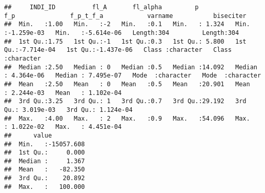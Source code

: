 \documentclass[
]{book}
\newenvironment{Shaded}{\begin{snugshade}}{\end{snugshade}}
\newcommand{\CommentTok}[1]{\textcolor[rgb]{0.56,0.35,0.01}{\textit{#1}}}
\newcommand{\DataTypeTok}[1]{\textcolor[rgb]{0.13,0.29,0.53}{#1}}
\newcommand{\KeywordTok}[1]{\textcolor[rgb]{0.13,0.29,0.53}{\textbf{#1}}}
\newcommand{\NormalTok}[1]{#1}
\newcommand{\OperatorTok}[1]{\textcolor[rgb]{0.81,0.36,0.00}{\textbf{#1}}}
\newcommand{\StringTok}[1]{\textcolor[rgb]{0.31,0.60,0.02}{#1}}
\begin{document}
\begin{Shaded}
\end{Shaded}

\begin{verbatim}
##     INDI_ID          fl_A       fl_alpha         p               f_p               f_p_t_f_a            varname           biseciter        
##  Min.   :1.00   Min.   :-2   Min.   :0.1   Min.   : 1.324   Min.   :-1.259e-03   Min.   :-5.614e-06   Length:304         Length:304        
##  1st Qu.:1.75   1st Qu.:-1   1st Qu.:0.3   1st Qu.: 5.800   1st Qu.:-7.714e-04   1st Qu.:-1.437e-06   Class :character   Class :character  
##  Median :2.50   Median : 0   Median :0.5   Median :14.092   Median : 4.364e-06   Median : 7.495e-07   Mode  :character   Mode  :character  
##  Mean   :2.50   Mean   : 0   Mean   :0.5   Mean   :20.901   Mean   : 2.244e-03   Mean   : 1.102e-04                                        
##  3rd Qu.:3.25   3rd Qu.: 1   3rd Qu.:0.7   3rd Qu.:29.192   3rd Qu.: 3.019e-03   3rd Qu.: 1.124e-04                                        
##  Max.   :4.00   Max.   : 2   Max.   :0.9   Max.   :54.096   Max.   : 1.022e-02   Max.   : 4.451e-04                                        
##      value           
##  Min.   :-15057.608  
##  1st Qu.:     0.000  
##  Median :     1.367  
##  Mean   :   -82.350  
##  3rd Qu.:    20.892  
##  Max.   :   100.000
\end{verbatim}
\end{document}
